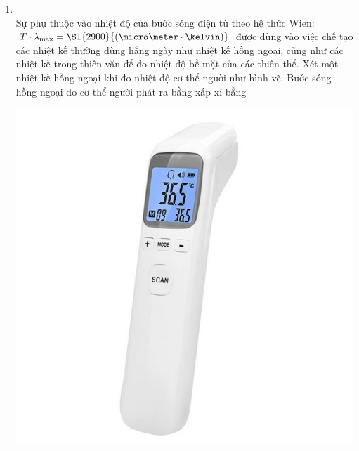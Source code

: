 \begin{enumerate}[label=\bfseries Câu \arabic*:, leftmargin=1.7cm]
\item {}\\
Sự phụ thuộc vào nhiệt độ của bước sóng điện từ theo hệ thức Wien: $T\cdot\lambda_\text{max}=\SI{2900}{\left(\micro\meter\cdot\kelvin\right)}$ được dùng vào việc chế tạo các nhiệt kế thường dùng hằng ngày như
nhiệt kế hồng ngoại, cũng như các nhiệt kế trong thiên văn để đo nhiệt độ bề mặt của
các thiên thể. Xét một nhiệt kế hồng ngoại khi đo nhiệt độ cơ thể người như hình vẽ.
Bước sóng hồng ngoại do cơ thể người phát ra bằng xấp xỉ bằng
\begin{center}
	\includegraphics[width=0.3\linewidth]{../figs/VN12-Y24-PH-SYL-002P-1}
\end{center}

\end{enumerate}

